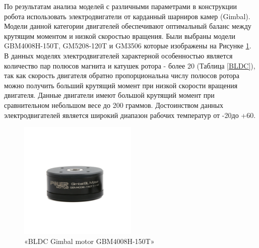 По результатам анализа моделей с различными параметрами в конструкции робота использовать электродвигатели от карданный шарниров камер (Gimbal). Модели данной категории двигателей обеспечивают оптимальный баланс между крутящим моментом и низкой скоростью вращения. Были выбраны модели GBM4008H-150T, GM5208-120T и GM3506 которые изображены на Рисунке \ref{GBM4008H}. В данных моделях электродвигателей характерной особенностью является количество пар полюсов магнита и катушек ротора - более 20 (Таблица \ref{BLDC}), так как скорость двигателя обратно пропорциональна числу полюсов ротора можно получить больший крутящий момент при низкой скорости вращения двигателя. Данные двигатели имеют большой крутящий момент при сравнительном небольшом весе до 200 граммов. Достоинством данных электродвигателей является широкий диапазон рабочих температур от -20\textdegree  до +60\textdegree \citep{simplefocBLDCMotors}.


\begin{figure}[H]
	\centering
	\includegraphics[width=0.5\textwidth]{Src/images/GM4008H-1.png}
	\caption{«BLDC Gimbal motor GBM4008H-150T»}
	\label{GBM4008H}
\end{figure}


